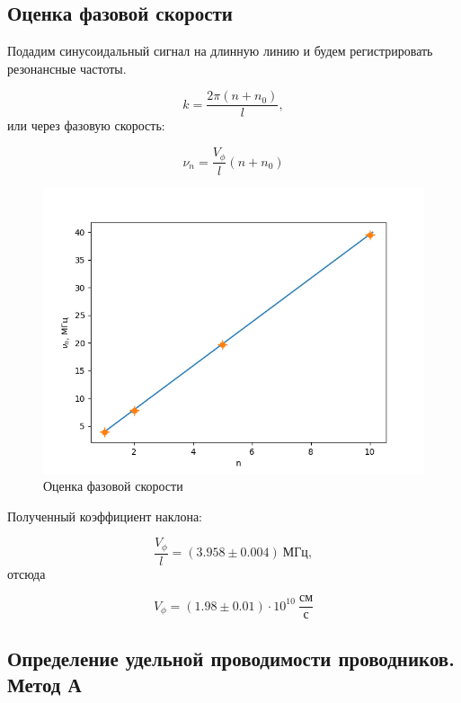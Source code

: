 \documentclass[a4paper]{article}
\begin{document}
\subsection{Оценка фазовой скорости}

Подадим синусоидальный сигнал на длинную линию и будем регистрировать резонансные частоты.

\begin{equation}
    k = \frac{2\pi (n + n_0)}{l},
\end{equation}
или через фазовую скорость:


\begin{equation}
    \nu_n = \frac{V_\phi}{l} (n + n_0)
\end{equation}

\begin{figure}[h!]
    \centering
    \includegraphics[width=0.6\pdfpagewidth]{graph2.png}
    \caption{Оценка фазовой скорости}
\end{figure}

Полученный коэффициент наклона:

\begin{equation}
    \frac{V_\phi}{l} = (3.958 \pm 0.004) ~ \text{МГц},
\end{equation}
отсюда

\begin{equation}
    V_\phi = (1.98 \pm 0.01) \cdot 10^{10} ~ \frac{\text{см}}{\text{с}}
\end{equation}

\subsection{Определение удельной проводимости проводников. Метод А}
\end{document}
